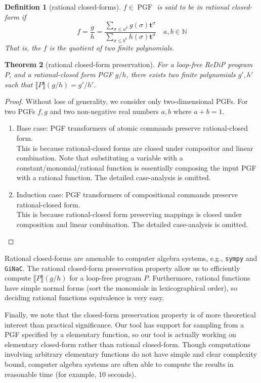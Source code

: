 \documentclass[a4paper]{article}
\DeclareMathOperator*{\PGF}{PGF}
\renewcommand{\S}[1]{ \llbracket #1 \rrbracket }
\newtheorem{theorem}{Theorem}[section]
\newtheorem{definition}[theorem]{Definition}
\begin{document}
\begin{definition}[rational closed-forms]
	\(f\in\PGF\) is said to be in rational closed-form if
	\[
		f = \frac{g}{h} = \dfrac{
			\sum_{\sigma \leq a^k} g(\sigma) \mathbf{t}^\sigma
		}{
			\sum_{\sigma \leq b^k} h(\sigma) \mathbf{t}^\sigma
		}
		\quad
		a,b \in \mathbb{N}
	\]
	That is, the \(f\) is the quotient of two finite polynomials.
\end{definition}

\begin{theorem}[rational closed-form preservation]
	For a loop-free ReDiP program \(P\), and a rational-closed form PGF \(g/h\),
	there exists two finite polynomials \(g',h'\) such that \(\S{P}(g/h) = g'/h'\).
\end{theorem}
\begin{proof}
	Without lose of generality, we consider only two-dimensional PGFs.
	For two PGFs \(f,g\) and two non-negative real numbers \(a,b\) where \(a+b=1\).
	\begin{enumerate}
		\item Base case: PGF transformers of atomic commands preserve rational-closed form.\\
		      This is because rational-closed forms are closed under compositor and linear combination.
		      Note that substituting a variable with a constant/monomial/rational function is essentially composing the input PGF with a rational function.
		      The detailed case-analysis is omitted.
		\item Induction case: PGF transformers of compositional commands preserve rational-closed form.\\
		      This is because rational-closed form preserving mappings is closed under composition and linear combination.
		      The detailed case-analysis is omitted.
	\end{enumerate}
\end{proof}

Rational closed-forms are amenable to computer algebra systems, e.g., \texttt{sympy} and \texttt{GiNaC}.
The rational closed-form preservation property allow us to efficiently compute \(\S{P}(g/h)\) for a loop-free program \(P\).
Furthermore, rational functions have simple normal forms (sort the monomials in lexicographical order), so deciding rational functions equivalence is very easy.\par
Finally, we note that the closed-form preservation property is of more theoretical interest than practical significance.
Our tool has support for sampling from a PGF specified by a elementary function, so our tool is actually working on elementary closed-form rather than rational closed-form.
Though computations involving arbitrary elementary functions do not have simple and clear complexity bound, computer algebra systems are often able to compute the results in reasonable time (for example, 10 seconds).
\end{document}
